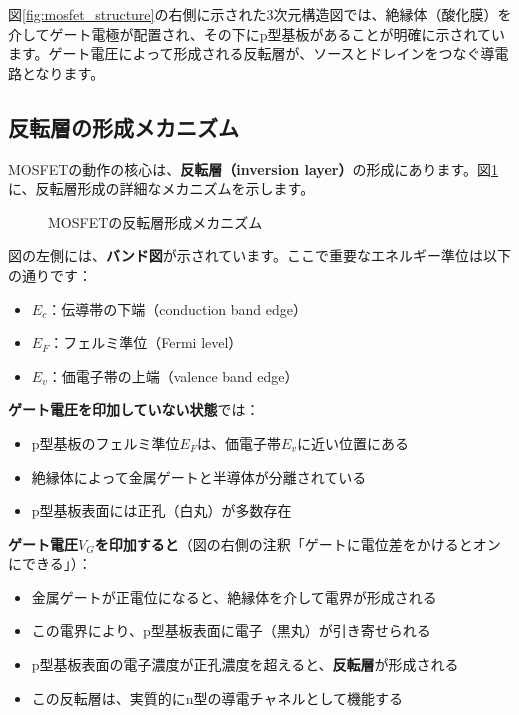 図\ref{fig:mosfet_structure}の右側に示された3次元構造図では、絶縁体（酸化膜）を介してゲート電極が配置され、その下にp型基板があることが明確に示されています。ゲート電圧によって形成される反転層が、ソースとドレインをつなぐ導電路となります。

\subsection{反転層の形成メカニズム}

MOSFETの動作の核心は、\textbf{反転層（inversion layer）}の形成にあります。図\ref{fig:mosfet_inversion}に、反転層形成の詳細なメカニズムを示します。

\begin{figure}[H]
\centering
{}
\caption{MOSFETの反転層形成メカニズム}
\label{fig:mosfet_inversion}
\end{figure}

図の左側には、\textbf{バンド図}が示されています。ここで重要なエネルギー準位は以下の通りです：

\begin{itemize}
\item $E_c$：伝導帯の下端（conduction band edge）
\item $E_F$：フェルミ準位（Fermi level）
\item $E_v$：価電子帯の上端（valence band edge）
\end{itemize}

\textbf{ゲート電圧を印加していない状態}では：

\begin{itemize}
\item p型基板のフェルミ準位$E_F$は、価電子帯$E_v$に近い位置にある
\item 絶縁体によって金属ゲートと半導体が分離されている
\item p型基板表面には正孔（白丸）が多数存在
\end{itemize}

\textbf{ゲート電圧$V_G$を印加すると}（図の右側の注釈「ゲートに電位差をかけるとオンにできる」）：

\begin{itemize}
\item 金属ゲートが正電位になると、絶縁体を介して電界が形成される
\item この電界により、p型基板表面に電子（黒丸）が引き寄せられる
\item p型基板表面の電子濃度が正孔濃度を超えると、\textbf{反転層}が形成される
\item この反転層は、実質的にn型の導電チャネルとして機能する
\end{itemize}

